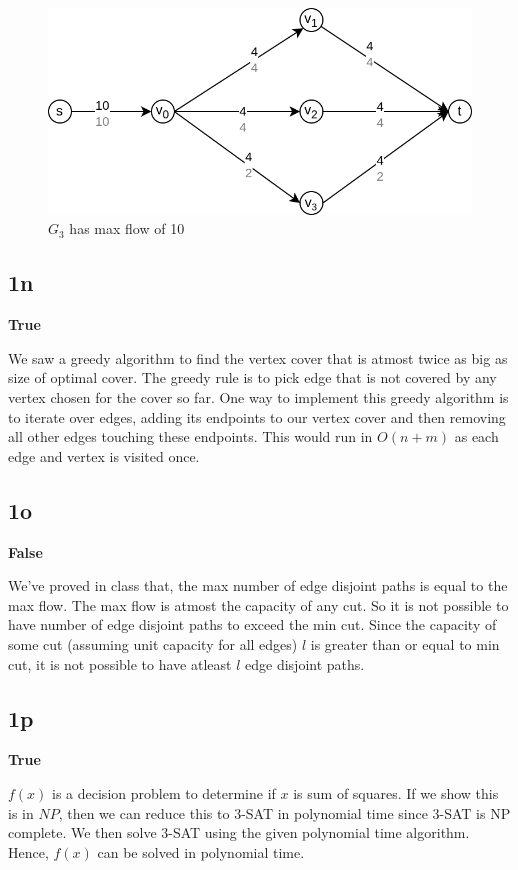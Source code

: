 \documentclass{article}
\begin{document}
    \begin{figure}[H]
        \includegraphics[width=1\textwidth]{maxflow3.png}
        \caption{$G_3$ has max flow of 10}
    \end{figure}

    \subsection*{1n}
    \textbf{True}

    We saw a greedy algorithm to find the vertex cover that is atmost twice as big as size of optimal cover. The greedy rule is to pick edge that is not covered by any vertex chosen for the cover so far. One way to implement this greedy algorithm is to iterate over edges, adding its endpoints to our vertex cover and then removing all other edges touching these endpoints. This would run in $O(n+m)$ as each edge and vertex is visited once.

    \subsection*{1o}
    \textbf{False}

    We've proved in class that, the max number of edge disjoint paths is equal to the max flow. The max flow is atmost the capacity of any cut. So it is not possible to have number of edge disjoint paths to exceed the min cut. Since the capacity of some cut (assuming unit capacity for all edges) $l$ is greater than or equal to min cut, it is not possible to have atleast $l$ edge disjoint paths.

    \subsection*{1p}
    \textbf{True}

    $f(x)$ is a decision problem to determine if $x$ is sum of squares. If we show this is in $NP$, then we can reduce this to 3-SAT in polynomial time since 3-SAT is NP complete. We then solve 3-SAT using the given polynomial time algorithm. Hence, $f(x)$ can be solved in polynomial time.
\end{document}
